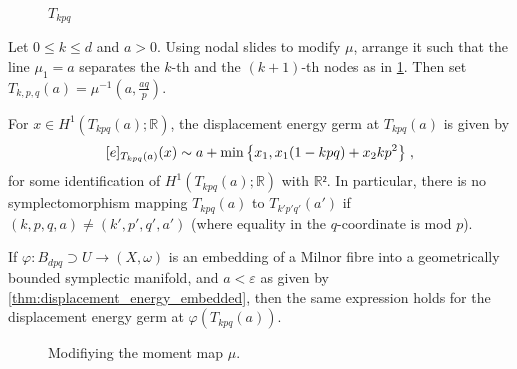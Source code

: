 \documentclass[12pt,a4paper,draft]{scrartcl}
\begin{document}
\begin{figure}
  \centering
  \caption{$T_{kpq}$}
  \label{fig:tkpq_def}
\end{figure}

\begin{definition}
  Let $0 ≤ k ≤ d$ and $a>0$.
  Using nodal slides to modify $μ$, arrange it such that the line $μ_1 = a$ separates the $k$-th and the $(k+1)$-th nodes as in \cref{fig:tkpq_def}.
  Then set $T_{k,p,q}(a) = μ^{-1}(a,\frac{aq}{p})$.
\end{definition}

\begin{theorem}
  \label{thm:main}

  For $x ∈ H^1(T_{kpq}(a); ℝ)$, the displacement energy germ at $T_{kpq}(a)$ is given by
  \[ [e]_{T_{kpq}(a)} (x) \sim a + \min\qty{x_1, x_1 (1-kpq) + x_2 k p^2} \; , \]
  for some identification of $H^1(T_{kpq}(a);ℝ)$ with $ℝ²$.
  In particular, there is no symplectomorphism mapping $T_{kpq}(a)$ to $T_{k'p'q'}(a')$ if $(k,p,q,a) ≠ (k',p',q',a')$ (where equality in the $q$-coordinate is mod $p$).

  If $φ \colon B_{dpq} ⊃ U → (X,ω)$ is an embedding of a Milnor fibre into a geometrically bounded symplectic manifold, and $a<ε$ as given by \cref{thm:displacement_energy_embedded}, then the same expression holds for the displacement energy germ at $φ(T_{kpq}(a))$.
\end{theorem}

\begin{figure}
  \centering
  \caption{Modifiying the moment map $μ$.}
  \label{fig:mod_moment_map}
\end{figure}
\end{document}
